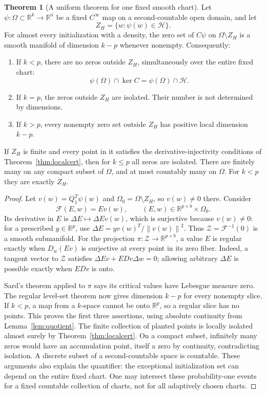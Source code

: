 \documentclass[11pt,a4paper]{article}
\theoremstyle{definition}
\newtheorem{theorem}{Theorem}[section]
\theoremstyle{definition}
\theoremstyle{remark}\newtheorem{remark}[theorem]{Remark}
\newcommand{\R}{\mathbb R}\newcommand{\Prob}{\mathbb P}\newcommand{\E}{\mathbb E}
\newcommand{\HH}{\mathcal H}\newcommand{\XX}{\mathcal X}\newcommand{\col}{\operatorname{col}}
\newcommand{\norm}[1]{\left\lVert #1\right\rVert}
\begin{document}
\begin{theorem}[A uniform theorem for one fixed smooth chart]\label{thm:global}
Let $\psi:\Omega\subset\R^k\to\R^n$ be a fixed $C^\infty$ map on a second-countable open domain, and let
\[
Z_H=\{w:\psi(w)\in\HH\}.
\]
For almost every initialization with a density, the zero set of $C\psi$ on $\Omega\setminus Z_H$ is a smooth manifold of dimension $k-p$ whenever nonempty. Consequently:
\begin{enumerate}
\item If $k<p$, there are no zeros outside $Z_H$, simultaneously over the entire fixed chart:
\begin{equation}\label{eq:exactspan}
\psi(\Omega)\cap\ker C=\psi(\Omega)\cap\HH.
\end{equation}
\item If $k=p$, the zeros outside $Z_H$ are isolated. Their number is not determined by dimensions.
\item If $k>p$, every nonempty zero set outside $Z_H$ has positive local dimension $k-p$.
\end{enumerate}
If $Z_H$ is finite and every point in it satisfies the derivative-injectivity conditions of Theorem~\ref{thm:localcert}, then for $k\le p$ all zeros are isolated. There are finitely many on any compact subset of $\Omega$, and at most countably many on $\Omega$. For $k<p$ they are exactly $Z_H$.
\end{theorem}
\begin{proof}
Let $v(w)=Q_1^T\psi(w)$ and $\Omega_0=\Omega\setminus Z_H$, so $v(w)\ne0$ there. Consider
\[
\mathcal F(E,w)=Ev(w),\qquad (E,w)\in\R^{p\times b}\times\Omega_0.
\]
Its derivative in $E$ is $\Delta E\mapsto\Delta E v(w)$, which is surjective because $v(w)\ne0$: for a prescribed $y\in\R^p$, use $\Delta E=yv(w)^T/\norm{v(w)}^2$. Thus $\mathcal Z=\mathcal F^{-1}(0)$ is a smooth submanifold. For the projection $\pi:\mathcal Z\to\R^{p\times b}$, a value $E$ is regular exactly when $D_w(Ev)$ is surjective at every point in its zero fiber. Indeed, a tangent vector to $\mathcal Z$ satisfies $\Delta E v+E Dv\Delta w=0$; allowing arbitrary $\Delta E$ is possible exactly when $E Dv$ is onto.

Sard's theorem applied to $\pi$ says its critical values have Lebesgue measure zero. The regular level-set theorem now gives dimension $k-p$ for every nonempty slice. If $k<p$, a map from a $k$-space cannot be onto $\R^p$, so a regular slice has no points. This proves the first three assertions, using absolute continuity from Lemma~\ref{lem:quotient}. The finite collection of planted points is locally isolated almost surely by Theorem~\ref{thm:localcert}. On a compact subset, infinitely many zeros would have an accumulation point, itself a zero by continuity, contradicting isolation. A discrete subset of a second-countable space is countable. These arguments also explain the quantifier: the exceptional initialization set can depend on the entire fixed chart. One may intersect these probability-one events for a fixed countable collection of charts, not for all adaptively chosen charts.
\end{proof}
\end{document}
